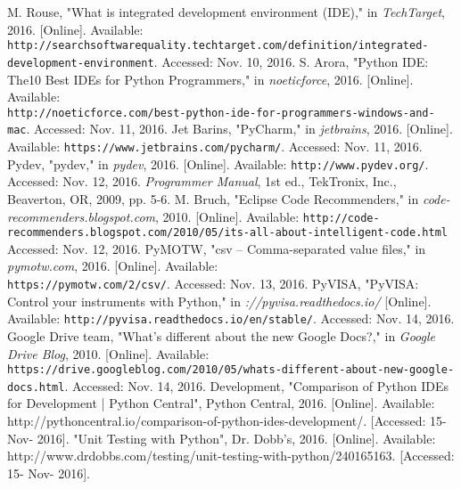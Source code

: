 \documentclass [10pt]{article}
\begin{document}
\pagebreak
\nocite{*}
\begin{thebibliography}{9}
M. Rouse, "What is integrated development environment (IDE)," in \textit{TechTarget}, 2016. [Online].
 Available: \\\texttt{http://searchsoftwarequality.techtarget.com/definition/integrated-development-environment}. Accessed: Nov. 10, 2016.
S. Arora, "Python IDE: The10 Best IDEs for Python Programmers," in \textit{noeticforce}, 2016. [Online]. 
Available: \\\texttt{http://noeticforce.com/best-python-ide-for-programmers-windows-and-mac}. Accessed: Nov. 11, 2016.
Jet Barins, "PyCharm," in \textit{jetbrains}, 2016. [Online]. Available: \texttt{https://www.jetbrains.com/pycharm/}. Accessed: Nov. 11, 2016.
Pydev, "pydev," in \textit{pydev}, 2016. [Online]. Available: \texttt{http://www.pydev.org/}. Accessed: Nov. 12, 2016.
\textit{Programmer Manual}, 1st ed., TekTronix, Inc., Beaverton, OR, 2009, pp. 5-6.
M. Bruch, "Eclipse Code Recommenders," in \textit{code-recommenders.blogspot.com}, 2010. [Online]. Available: \texttt{http://code-recommenders.blogspot.com/2010/05/its-all-about-intelligent-code.html} Accessed: Nov. 12, 2016.
PyMOTW, "csv – Comma-separated value files," in \textit{pymotw.com}, 2016. [Online]. Available: \\\texttt{https://pymotw.com/2/csv/}. Accessed: Nov. 13, 2016.
PyVISA, "PyVISA: Control your instruments with Python," in \textit{://pyvisa.readthedocs.io/} [Online]. Available: \texttt{http://pyvisa.readthedocs.io/en/stable/}. Accessed: Nov. 14, 2016.
Google Drive team, "What’s different about the new Google Docs?," in \textit{Google Drive Blog}, 2010. [Online]. Available: \texttt{https://drive.googleblog.com/2010/05/whats-different-about-new-google-docs.html}. Accessed: Nov. 14, 2016.
Development, "Comparison of Python IDEs for Development | Python Central", Python Central, 2016. [Online]. Available: http://pythoncentral.io/comparison-of-python-ides-development/. [Accessed: 15- Nov- 2016].
"Unit Testing with Python", Dr. Dobb's, 2016. [Online]. Available: http://www.drdobbs.com/testing/unit-testing-with-python/240165163. [Accessed: 15- Nov- 2016].

\end{thebibliography}
\end{document}
